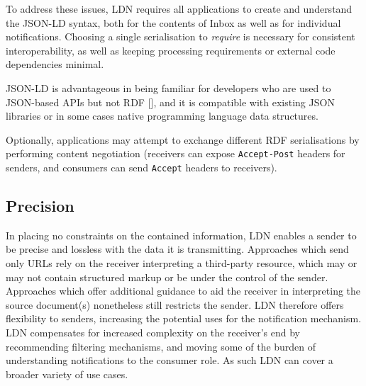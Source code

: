                                         To address these issues, LDN requires all applications to create and understand the JSON-LD syntax, both for the contents of Inbox as well as for individual notifications. Choosing a single serialisation to {\em require} is necessary for consistent interoperability, as well as keeping processing requirements or external code dependencies minimal.

                                        JSON-LD is advantageous in being familiar for developers who are \empty used to JSON-based APIs but not RDF [], and it is compatible with existing JSON libraries or in some cases native programming language data structures.
                                    

                                    
\par Optionally, applications may attempt to exchange different RDF serialisations by performing content negotiation (receivers can expose {\tt Accept-Post} headers for senders, and consumers can send {\tt Accept} headers to receivers).
                                
                            

                            
                                \subsection{Precision}
  \label{precision}

                                
                                    
\par In placing no constraints on the contained information, LDN enables a sender to be precise and lossless with the data it is transmitting. Approaches which send only URLs rely on the receiver interpreting a third-party resource, which may or may not contain structured markup or be under the control of the sender. Approaches which offer additional guidance to aid the receiver in interpreting the source document(s) nonetheless still restricts the sender. LDN therefore offers flexibility to senders, increasing the potential uses for the notification mechanism. LDN compensates for increased complexity on the receiver’s end by recommending filtering mechanisms, and moving some of the burden of understanding notifications to the consumer role. As such LDN can cover a broader variety of use cases.
                                
